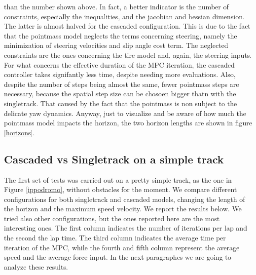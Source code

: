 \documentclass[a4paper, onecolumn, 12pt]{article}
\begin{document}
than the number shown above. In fact, a better indicator is the number of
constraints, especially the inequalities, and the jacobian and hessian
dimension. The latter is almost halved for the cascaded configuration. This is
due to the fact that the pointmass model neglects the terms concerning steering,
namely the minimization of steering velocities and slip angle cost term. The
neglected constraints are the ones concerning the tire model and, again, the
steering inputs. For what concerns the effective duration of the MPC iteration,
the cascaded controller takes signifantly less time, despite needing more
evaluations. Also, despite the number of steps being almost the same, fewer
pointmass steps are necessary, because the spatial step size can be chosoen
bigger thatn with the singletrack. That caused by the fact that the pointmass is
non subject to the delicate yaw dynamics. Anyway, just to visualize and be aware
of how much the pointmass model impacts the horizon, the two horizon lengths are
shown in figure \ref{horizons}.

\subsection{Cascaded vs Singletrack on a simple track}

The first set of tests was carried out on a pretty simple track, as the one in Figure
\ref{ippodromo}, without obstacles for the moment. We compare different configurations
for both singletrack and cascaded models, changing the length of the horizon and the 
maximum speed velocity. We report the results below. We tried also other configurations,
but the ones reported here are the most interesting ones. 
The first column indicates the number of iterations per lap and the second the lap
time. The third column indicates the average time per iteration of the MPC,
while the fourth and fifth column represent the average speed and the average
force input. In the next paragraphes we are going to analyze these results. 
\end{document}
